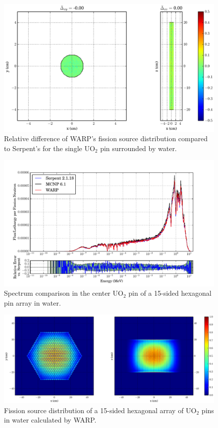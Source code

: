 \begin{figure}[h!]
\centering
\includegraphics[width=\textwidth,trim= 11cm 0cm 6cm 0cm]{graphics/finalresults/pincell_fiss_diff-6.eps}
\caption{Relative difference of WARP's fission source distribution compared to Serpent's for the single UO$_2$ pin surrounded by water. \label{pincell_fiss_diff} }
\end{figure}

\begin{figure}[h!] 
\centering
\includegraphics[width=\textwidth,trim= 1cm 0cm 1cm 0cm]{graphics/finalresults/assembly_spec-6.pdf}
\caption{Spectrum comparison in the center UO$_2$ pin of a 15-sided hexagonal pin array in water. \label{assembly_spec} }
\end{figure}

\begin{figure}[h!]
\centering
\includegraphics[width=\textwidth,trim= 4cm 0cm 6cm 0cm]{graphics/finalresults/assembly_fiss-6.eps}
\caption{Fission source distribution of a 15-sided hexagonal array of UO$_2$ pins in water calculated by WARP. \label{assembly_fiss} }
\end{figure}

